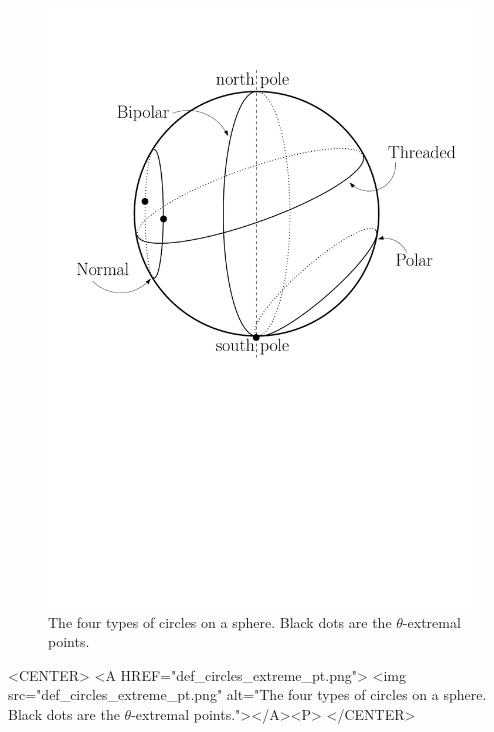 \begin{ccTexOnly}
\begin{figure}[ht!]
\centerline{
 \includegraphics[height=.5\textwidth]{Circular_kernel_3/def_circles_extreme_pt}
}
\caption{The four types of circles on a sphere. Black dots
  are the $\theta$-extremal points.  \label{fig-def-circles}}
\end{figure}
\end{ccTexOnly}


\begin{ccHtmlOnly}
    <CENTER>
    <A HREF="def_circles_extreme_pt.png">
        <img src="def_circles_extreme_pt.png" alt="The four types of circles on a sphere. Black dots are the $\theta$-extremal points."></A><P>
    </CENTER>
\end{ccHtmlOnly}





